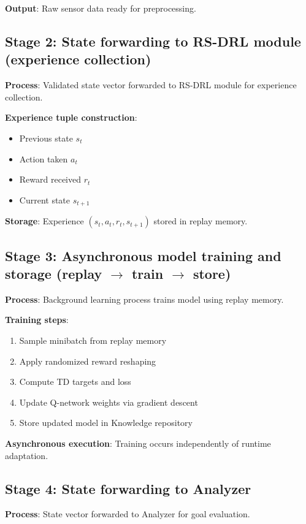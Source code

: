 \documentclass[11pt,a4paper]{article}
\begin{document}
\textbf{Output}: Raw sensor data ready for preprocessing.

\subsection{Stage 2: State forwarding to RS-DRL module (experience collection)}

\textbf{Process}: Validated state vector forwarded to RS-DRL module for experience collection.

\textbf{Experience tuple construction}:
\begin{itemize}
    \item Previous state $s_t$
    \item Action taken $a_t$
    \item Reward received $r_t$
    \item Current state $s_{t+1}$
\end{itemize}

\textbf{Storage}: Experience $(s_t, a_t, r_t, s_{t+1})$ stored in replay memory.

\subsection{Stage 3: Asynchronous model training and storage (replay $\rightarrow$ train $\rightarrow$ store)}

\textbf{Process}: Background learning process trains model using replay memory.

\textbf{Training steps}:
\begin{enumerate}
    \item Sample minibatch from replay memory
    \item Apply randomized reward reshaping
    \item Compute TD targets and loss
    \item Update Q-network weights via gradient descent
    \item Store updated model in Knowledge repository
\end{enumerate}

\textbf{Asynchronous execution}: Training occurs independently of runtime adaptation.

\subsection{Stage 4: State forwarding to Analyzer}

\textbf{Process}: State vector forwarded to Analyzer for goal evaluation.
\end{document}
